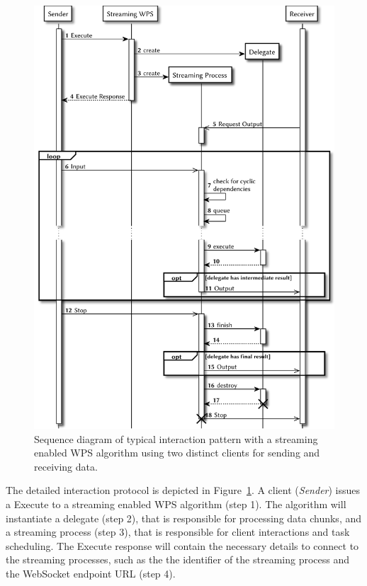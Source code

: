 	\begin{figure}[!htb]
		\centering
		\includegraphics[width=.7868\textwidth]{figures/sequence-diagramm-swps.pdf} %
		\caption{\label{fig:sd:swps} Sequence diagram of typical interaction pattern with a streaming enabled WPS algorithm using two distinct clients for sending and receiving data.}
	\end{figure}

	The detailed interaction protocol is depicted in Figure~\ref{fig:sd:swps}. A client (\emph{Sender}) issues a Execute to a streaming enabled WPS algorithm (step 1). The algorithm will instantiate a delegate (step 2), that is responsible for processing data chunks, and a streaming process (step 3), that is responsible for client interactions and task scheduling. The Execute response will contain the necessary details to connect to the streaming processes, such as the the identifier of the streaming process and the WebSocket endpoint URL (step 4).

